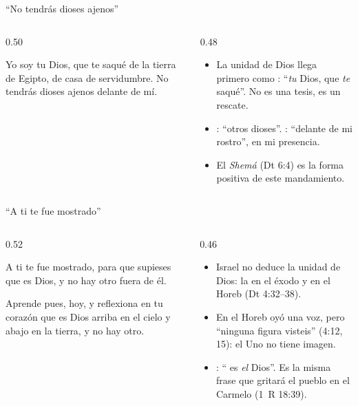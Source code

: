 \begin{frame}{``No tendrás dioses ajenos''}
\begin{columns}[t,onlytextwidth]
\begin{column}{0.50\textwidth}
\begin{center}\small{}\end{center}
\begin{cita}Yo soy \SENOR{} tu Dios, que te saqué de la tierra de Egipto, de casa de servidumbre. No tendrás dioses ajenos delante de mí.\end{cita}
\end{column}
\begin{column}{0.48\textwidth}\small
\begin{itemize}
\item La unidad de Dios llega primero como : ``\emph{tu} Dios, que \emph{te} saqué''. No es una tesis, es un rescate.
\item {}: ``otros dioses''. : ``delante de mi rostro'', en mi presencia.
\item El \emph{Shemá} (Dt 6:4) es la forma positiva de este mandamiento.
\end{itemize}
\end{column}
\end{columns}
\end{frame}

\begin{frame}{``A ti te fue mostrado''}
\begin{columns}[t,onlytextwidth]
\begin{column}{0.52\textwidth}
\begin{center}\scriptsize{}\end{center}
\begin{cita}[fontupper=\scriptsize\itshape]A ti te fue mostrado, para que supieses que \SENOR{} es Dios, y no hay otro fuera de él.\end{cita}
\begin{cita}[fontupper=\scriptsize\itshape]Aprende pues, hoy, y reflexiona en tu corazón que \SENOR{} es Dios arriba en el cielo y abajo en la tierra, y no hay otro.\end{cita}
\end{column}
\begin{column}{0.46\textwidth}\small
\begin{itemize}
\item Israel no deduce la unidad de Dios: la  en el éxodo y en el Horeb (Dt 4:32--38).
\item En el Horeb oyó una voz, pero ``ninguna figura visteis'' (4:12, 15): el Uno no tiene imagen.
\item {}: ``\SENOR{} es \emph{el} Dios''. Es la misma frase que gritará el pueblo en el Carmelo (1~R 18:39).
\end{itemize}
\end{column}
\end{columns}
\end{frame}

